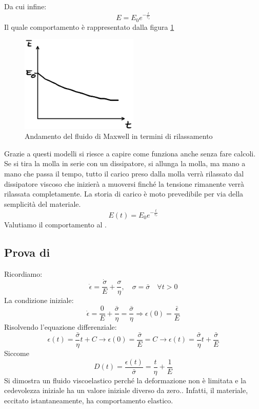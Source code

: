 Da cui infine:
\begin{equation}
E=E_0 e^{-\frac{t}{\tau_r}}
\end{equation}
Il quale comportamento è rappresentato dalla figura \ref{fig:RilassamentoMaxwell}
\begin{figure}
\centering
\includegraphics[width = 0.5\textwidth]{gfx/RilassamentoMaxwell}
\caption{Andamento del fluido di Maxwell in termini di rilassamento}
\label{fig:RilassamentoMaxwell}
\end{figure}

Grazie a questi modelli si riesce a capire come funziona anche senza fare calcoli.
Se si tira la molla in serie con un dissipatore, si allunga la molla, ma mano a mano che passa il tempo, tutto il carico preso dalla molla verrà rilassato dal dissipatore viscoso che inizierà a muoversi finché la tensione rimanente verrà rilassata completamente.
La storia di carico è moto prevedibile per via della semplicità del materiale.
\begin{equation}
E(t) = E_0 e^{-\frac{t}{\tau_r}}
\end{equation}
Valutiamo il comportamento al .
\subsection{Prova di }
Ricordiamo:
\begin{equation}
\dot{\epsilon} = \frac{\dot{\sigma}}{E} + \frac{\sigma}{\eta}, \quad \sigma = \bar{\sigma} \quad \forall t > 0
\end{equation}
La condizione iniziale:
\begin{equation}
\dot{\epsilon} = \frac{0}{E} + \frac{\bar{\sigma}}{\eta} = \frac{\bar{\sigma}}{\eta} \Rightarrow \epsilon(0)=\frac{\bar{\epsilon}}{E}
\end{equation}
Risolvendo l'equazione differenziale:
\begin{equation}
\epsilon(t) = \frac{\bar{\sigma}}{\eta}t + C \rightarrow \epsilon(0) = \frac{\bar{\sigma}}{E} = C \rightarrow \epsilon(t) = \frac{\bar{\sigma}}{\eta}t + \frac{\bar{\sigma}}{E}
\end{equation}
Siccome
\begin{equation}
D(t) = \frac{\epsilon(t)}{\bar{\sigma}} = \frac{t}{\eta} + \frac{1}{E}
\end{equation}
Si dimostra un fluido viscoelastico perché la deformazione non è limitata e la cedevolezza iniziale ha un valore iniziale diverso da zero..
Infatti, il materiale, eccitato istantaneamente, ha comportamento elastico.

